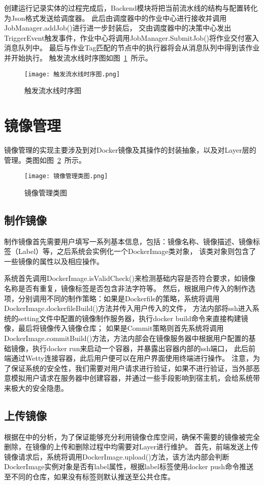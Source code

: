 创建运行记录实体的过程完成后，Backend模块将把当前流水线的结构与配置转化为Json格式发送给调度器。
此后由调度器中的作业中心进行接收并调用JobManager.addJob()进行进一步封装后，
交由调度器中的决策中心发出TriggerEvent触发事件，作业中心将调用JobManager.SubmitJob()将作业交付塞入消息队列中。
最后与作业Tag匹配的节点中的执行器将会从消息队列中得到该作业并开始执行。
触发流水线时序图如图~\ref{fig:触发流水线时序图}~所示。

\begin{figure}[h]
  \centering
  \texttt{[image: 触发流水线时序图.png]}
  \caption{触发流水线时序图}
  \label{fig:触发流水线时序图}
\end{figure}

\section{镜像管理}
镜像管理的实现主要涉及到对Docker镜像及其操作的封装抽象，以及对Layer层的管理。类图如图~\ref{fig:镜像管理类图}~所示。

\begin{figure}[h]
  \centering
  \texttt{[image: 镜像管理类图.png]}
  \caption{镜像管理类图}
  \label{fig:镜像管理类图}
\end{figure}

\subsection{制作镜像}
制作镜像首先需要用户填写一系列基本信息，包括：镜像名称、镜像描述、镜像标签（Label）等，之后系统会实例化一个DockerImage类对象，
该类对象则包含了一些镜像的属性以及相应操作。

系统首先调用DockerImage.isValidCheck()来检测基础内容是否符合要求，如镜像名称是否有重复，镜像标签是否包含非法字符等。
然后，根据用户传入的制作选项，分别调用不同的制作策略：如果是Dockerfile的策略，系统将调用DockerImage.dockerfileBuild()方法并传入用户传入的文件，
方法内部将ssh进入系统的setting文件中配置的镜像制作服务器，执行docker build命令来直接构建镜像，最后将镜像传入镜像仓库；
如果是Commit策略则首先系统将调用DockerImage.commitBuild()方法，方法内部会在镜像服务器中根据用户配置的基础镜像，执行docker run来启动一个容器，并暴露出容器内部的ssh端口，
此后前端通过Wetty连接容器，此后用户便可以在用户界面使用终端进行操作。
注意，为了保证系统的安全性，我们需要对用户请求进行验证，如果不进行验证，当外部恶意模拟用户请求在服务器中创建容器，并通过一些手段影响到宿主机，会给系统带来极大的安全隐患。

\subsection{上传镜像}
根据在中的分析，为了保证能够充分利用镜像仓库空间，确保不需要的镜像被完全删除，在镜像的上传和删除过程中均需要对Layer进行维护。
首先，前端发送上传镜像请求后，系统将调用DockerImage.upload()方法，该方法内部会判断DockerImage实例对象是否有label属性，根据label标签使用docker push命令推送至不同的仓库，如果没有标签则默认推送至公共仓库。

